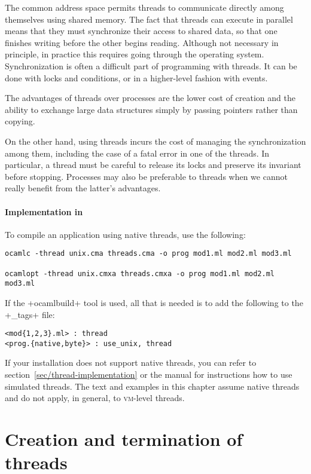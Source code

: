 The common address space permits threads to communicate directly among
themselves using shared memory. The fact that threads can execute in
parallel means that they must synchronize their access to shared data,
so that one finishes writing before the other begins reading.
Although not necessary in principle, in practice this requires going
through the operating system. Synchronization is often a difficult
part of programming with threads. It can be done with locks and
conditions, or in a higher-level fashion with events.

The advantages of threads over processes are the lower cost of
creation and the ability to exchange large data structures simply by
passing pointers rather than copying.

On the other hand, using threads incurs the cost of managing the
synchronization among them, including the case of a fatal error in one
of the threads. In particular, a thread must be careful to release its
locks and preserve its invariant before stopping. Processes may also
be preferable to threads when we cannot really benefit from the
latter's advantages.

\paragraph{Implementation in {\ocaml}}

To compile an application using native threads, use the following:
\begin{lstlisting}
ocamlc -thread unix.cma threads.cma -o prog mod1.ml mod2.ml mod3.ml

ocamlopt -thread unix.cmxa threads.cmxa -o prog mod1.ml mod2.ml mod3.ml
\end{lstlisting}
If the \ml+ocamlbuild+ tool is used, all that is needed is to add the
following to the \ml+_tags+ file:
\begin{lstlisting}
<mod{1,2,3}.ml> : thread
<prog.{native,byte}> : use_unix, thread
\end{lstlisting}
%
If your installation does not support native threads, you can refer to
section~\ref{sec/thread-implementation} or the manual for instructions
how to use simulated  threads.  The text
and examples in this chapter assume native threads and do not apply,
in general, to \textsc{vm}-level threads.

\section{Creation and termination of threads}

